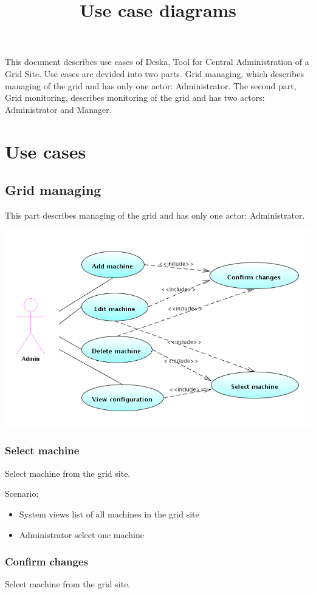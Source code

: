 \documentclass{article}
\begin{document}
\title{Use case diagrams}

This document describes use cases of Deska, Tool for Central Administration
of a Grid Site. Use cases are devided into two parts. Grid managing, which
describes managing of the grid and has only one actor: Administrator.
The second part, Grid monitoring, describes monitoring of the grid and has
two actors: Administrator and Manager.

\section{Use cases}

\subsection{Grid managing}
This part describes managing of the grid and has only one actor: Administrator.

\includegraphics[width=\linewidth]{grid_managing.png}

\subsubsection{Select machine}
Select machine from the grid site.

Scenario:
\begin{itemize}
\item{System views list of all machines in the grid site}
\item{Administrator select one machine}
\end{itemize}

\subsubsection{Confirm changes}
Select machine from the grid site.
\end{document}
